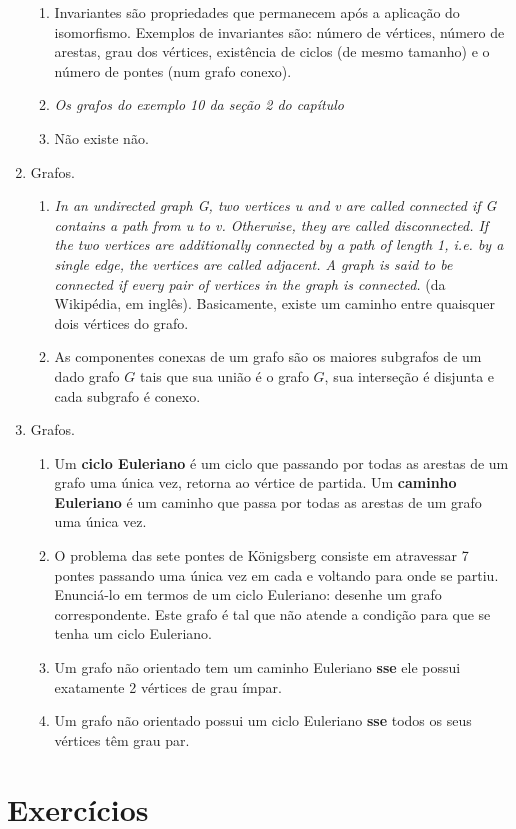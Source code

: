 \documentclass{article}
\begin{document}
\begin{enumerate}
\begin{enumerate}
		      \item Invariantes são propriedades que permanecem após a aplicação do isomorfismo. Exemplos de invariantes são: número de vértices, número de arestas, grau dos vértices, existência de ciclos (de mesmo tamanho) e o número de pontes (num grafo conexo).

		      \item \textit{Os grafos do exemplo 10 da seção 2 do capítulo}

		      \item Não existe não.

	      \end{enumerate}

	\item Grafos.
	      \begin{enumerate}

		      \item \textit{In an undirected graph G, two vertices u and v are called connected if G contains a path from u to v. Otherwise, they are called disconnected. If the two vertices are additionally connected by a path of length 1, i.e. by a single edge, the vertices are called adjacent. A graph is said to be connected if every pair of vertices in the graph is connected.} (da Wikipédia, em inglês). Basicamente, existe um caminho entre quaisquer dois vértices do grafo.

		      \item As componentes conexas de um grafo são os maiores subgrafos de um dado grafo \( G \) tais que sua união é o grafo \( G \), sua interseção é disjunta e cada subgrafo é conexo.

	      \end{enumerate}

	\item Grafos.

	      \begin{enumerate}

		      \item Um \textbf{ciclo Euleriano} é um ciclo que passando por todas as arestas de um grafo uma única vez, retorna ao vértice de partida. Um \textbf{caminho Euleriano} é um caminho que passa por todas as arestas de um grafo uma única vez.

		      \item O problema das sete pontes de Königsberg consiste em atravessar 7 pontes passando uma única vez em cada e voltando para onde se partiu. Enunciá-lo em termos de um ciclo Euleriano: desenhe um grafo correspondente. Este grafo é tal que não atende a condição para que se tenha um ciclo Euleriano.

		      \item Um grafo não orientado tem um caminho Euleriano \textbf{sse} ele possui exatamente 2 vértices de grau ímpar.

		      \item Um grafo não orientado possui um ciclo Euleriano \textbf{sse} todos os seus vértices têm grau par.

	      \end{enumerate}

\end{enumerate}

\section*{Exercícios}
\end{document}
